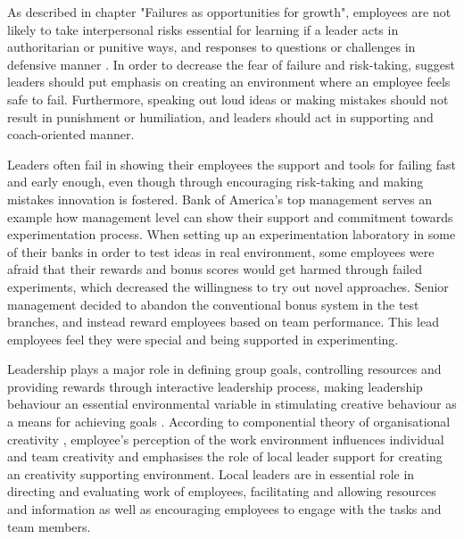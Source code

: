 As described in chapter "Failures as opportunities for growth", employees are not likely to take interpersonal risks essential for learning if a leader acts in authoritarian or punitive ways, and responses to questions or challenges in defensive manner \citep{edmondson1999psychological}. In order to decrease the fear of failure and risk-taking, \citet{amabile2008creativity} suggest leaders should put emphasis on creating an environment where an employee feels safe to fail. Furthermore, speaking out loud ideas or making mistakes should not result in punishment or humiliation, and leaders should act in supporting and coach-oriented manner\citep{edmondson1999psychological}.

Leaders often fail in showing their employees the support and tools for failing fast and early enough, even though through encouraging risk-taking and making mistakes innovation is fostered.\citep{farson2002failuretolerantleader} Bank of America's top management serves an example how management level can show their support and commitment towards experimentation process. When setting up an experimentation laboratory in some of their banks in order to test ideas in real environment, some employees were afraid that their rewards and bonus scores would get harmed through failed experiments, which decreased the willingness to try out novel approaches. Senior management decided to abandon the conventional bonus system in the test branches, and instead reward employees based on team performance. This lead employees feel they were special and being supported in experimenting. \citep{thomke2003r}

Leadership plays a major role in defining group goals, controlling resources and providing rewards through interactive leadership process, making leadership behaviour an essential environmental variable in stimulating creative behaviour as a means for achieving goals \citep{redmond1993putting}. According to componential theory of organisational creativity \citep{hennessey19881,amabile1996assessing}, employee's perception of the work environment influences individual and team creativity and emphasises the role of local leader support for creating an creativity supporting environment. Local leaders are in essential role in directing and evaluating work of employees, facilitating and allowing resources and information as well as encouraging employees to engage with the tasks and team members. \citep{amabile2004leader}
 
